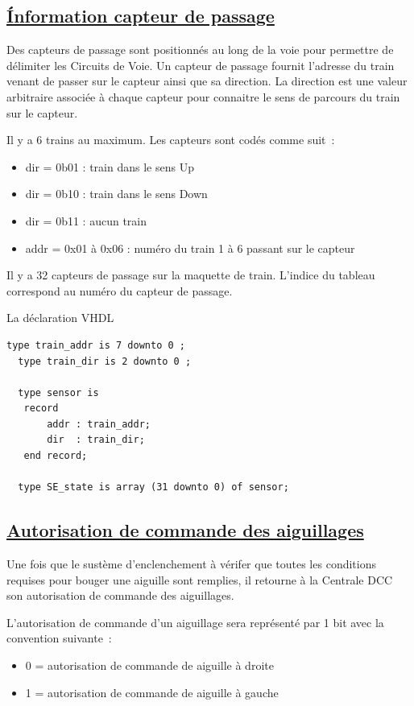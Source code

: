 \subsection{\underline{\'Information capteur de passage}}
\label{sec:ixl_cdv}

Des capteurs de passage sont positionnés au long de la voie pour 
permettre de délimiter les Circuits de Voie. Un capteur de passage
fournit l'adresse du train venant de passer sur le capteur ainsi que
sa direction. La direction est une valeur arbitraire associée à 
chaque capteur pour connaitre le sens de parcours du train sur le capteur.


Il y a 6 trains au maximum. Les capteurs sont codés comme suit~:
\begin{itemize}
  \item dir = 0b01 : train dans le sens Up
  \item dir = 0b10 : train dans le sens Down
  \item dir = 0b11 : aucun train
  \item addr = 0x01 à 0x06 : numéro du train 1 à 6 passant sur le capteur
\end{itemize}  

Il y a 32 capteurs de passage sur la maquette de train. L'indice du
tableau correspond au numéro du capteur de passage.

\medskip
La déclaration VHDL
\begin{lstlisting}[style=vhdl]
  type train_addr is 7 downto 0 ;
  type train_dir is 2 downto 0 ;

  type sensor is
   record
       addr : train_addr;
       dir  : train_dir;
   end record;

  type SE_state is array (31 downto 0) of sensor;
\end{lstlisting}


\subsection{\underline{Autorisation de commande des aiguillages}}
\label{sec:ixl_dem_aig}

Une fois que le sustème d'enclenchement à vérifer que toutes les
conditions requises pour bouger une aiguille sont remplies, il 
retourne à la Centrale DCC son autorisation de commande des aiguillages.

L'autorisation de commande d'un aiguillage sera représenté par
1 bit avec la convention suivante~:
\begin{itemize}
\item 0 = autorisation de commande de aiguille à droite
\item 1 = autorisation de commande de aiguille à gauche
\end{itemize}
 
